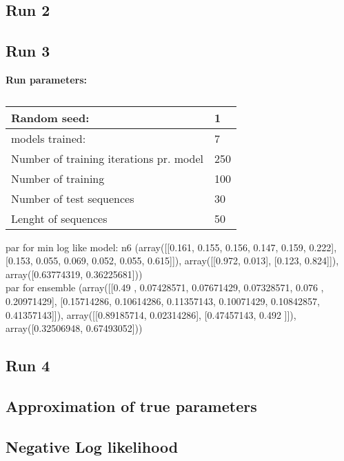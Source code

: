 



\subsection{Run 2}


\subsection{Run 3}

\textbf{Run parameters:} \\
\begin{table}[]
    \begin{tabular}{@{}ll@{}}
        \toprule
        Random seed:                            & 1   \\ \midrule
        models trained:                         & 7   \\
        Number of training iterations pr. model & 250 \\
        Number of training                      & 100 \\
        Number of test sequences                & 30 \\
        Lenght of sequences                     & 50  \\ \bottomrule
    \end{tabular}
    \caption{}
    \label{tab:my-table}
\end{table}

par for min log like model: n6
(array([[0.161, 0.155, 0.156, 0.147, 0.159, 0.222],
        [0.153, 0.055, 0.069, 0.052, 0.055, 0.615]]),
 array([[0.972, 0.013],
        [0.123, 0.824]]),
 array([0.63774319, 0.36225681]))\\

par for ensemble
(array([[0.49      , 0.07428571, 0.07671429, 0.07328571, 0.076     ,
         0.20971429],
        [0.15714286, 0.10614286, 0.11357143, 0.10071429, 0.10842857,
         0.41357143]]),
 array([[0.89185714, 0.02314286],
        [0.47457143, 0.492     ]]),
 array([0.32506948, 0.67493052]))


\subsection{Run 4}



\subsection{Approximation of true parameters}


\subsection{Negative Log likelihood}




